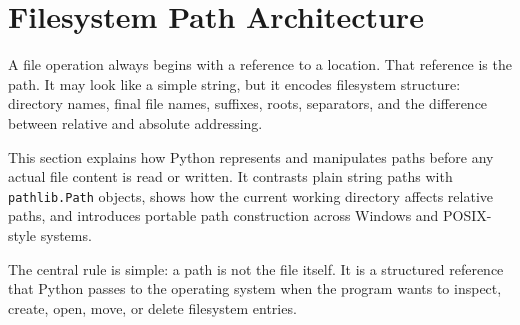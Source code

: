 \section{Filesystem Path Architecture}

A file operation always begins with a reference to a location. That reference is the path. It may look like a simple string, but it encodes filesystem structure: directory names, final file names, suffixes, roots, separators, and the difference between relative and absolute addressing.

This section explains how Python represents and manipulates paths before any actual file content is read or written. It contrasts plain string paths with \texttt{pathlib.Path} objects, shows how the current working directory affects relative paths, and introduces portable path construction across Windows and POSIX-style systems.

The central rule is simple: a path is not the file itself. It is a structured reference that Python passes to the operating system when the program wants to inspect, create, open, move, or delete filesystem entries.